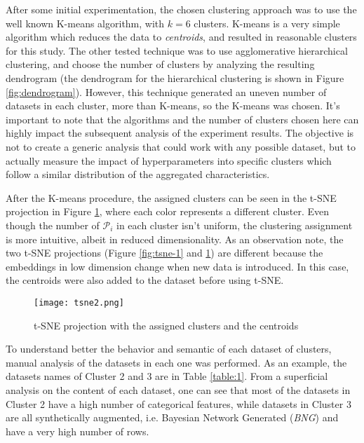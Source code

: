 After some initial experimentation, the chosen clustering approach was to use the well known K-means algorithm, with $k=6$ clusters. K-means is a very simple algorithm which reduces the data to \textit{centroids}, and resulted in reasonable clusters for this study. The other tested technique was to use agglomerative hierarchical clustering, and choose the number of clusters by analyzing the resulting dendrogram (the dendrogram for the hierarchical clustering is shown in Figure \ref{fig:dendrogram}). However, this technique generated an uneven number of datasets in each cluster, more than K-means, so the K-means was chosen. It's important to note that the algorithms and the number of clusters chosen here can highly impact the subsequent analysis of the experiment results. The objective is not to create a generic analysis that could work with any possible dataset, but to actually measure the impact of hyperparameters into specific clusters which follow a similar distribution of the aggregated characteristics.

After the K-means procedure, the assigned clusters can be seen in the t-SNE projection in Figure \ref{fig:tsne-2}, where each color represents a different cluster. Even though the number of $\mathcal{P}_i$ in each cluster isn't uniform, the clustering assignment is more intuitive, albeit in reduced dimensionality. As an observation note, the two t-SNE projections (Figure \ref{fig:tsne-1} and  \ref{fig:tsne-2}) are different because the embeddings in low dimension change when new data is introduced. In this case, the centroids were also added to the dataset before using t-SNE.

\begin{figure}[!h]
    \centering
    \texttt{[image: tsne2.png]}
    \caption{t-SNE projection with the assigned clusters and the centroids}
    \label{fig:tsne-2}
\end{figure}

To understand better the behavior and semantic of each dataset of clusters, manual analysis of the datasets in each one was performed. As an example, the datasets names of Cluster 2 and 3 are in Table \ref{table:1}. From a superficial analysis on the content of each dataset, one can see that most of the datasets in Cluster 2 have a high number of categorical features, while datasets in Cluster 3 are all synthetically augmented, i.e. Bayesian Network Generated (\textit{BNG}) and have a very high number of rows.

